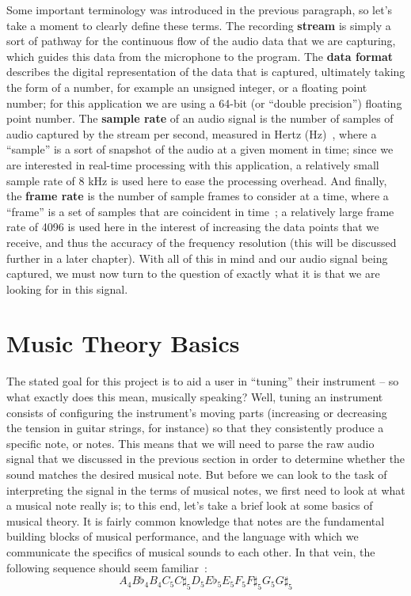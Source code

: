 \documentclass[12pt]{report}
\begin{document}
\indent Some important terminology was introduced in the previous paragraph, so let's take a moment to clearly define these terms. The recording {\bf stream} is simply a sort of pathway for the continuous flow of the audio data that we are capturing, which guides this data from the microphone to the program. The {\bf data format} describes the digital representation of the data that is captured, ultimately taking the form of a number, for example an unsigned integer, or a floating point number; for this application we are using a 64-bit (or ``double precision'') floating point number. The {\bf sample rate} of an audio signal is the number of samples of audio captured by the stream per second, measured in Hertz (Hz)~\cite{Audacity-nd}, where a ``sample'' is a sort of snapshot of the audio at a given moment in time; since we are interested in real-time processing with this application, a relatively small sample rate of 8 kHz is used here to ease the processing overhead. And finally, the {\bf frame rate} is the number of sample frames to consider at a time, where a ``frame'' is a set of samples that are coincident in time~\cite{Bernard2001}; a relatively large frame rate of 4096 is used here in the interest of increasing the data points that we receive, and thus the accuracy of the frequency resolution (this will be discussed further in a later chapter). With all of this in mind and our audio signal being captured, we must now turn to the question of exactly what it is that we are looking for in this signal.


\section{Music Theory Basics}
\indent The stated goal for this project is to aid a user in ``tuning'' their instrument -- so what exactly does this mean, musically speaking? Well, tuning an instrument consists of configuring the instrument's moving parts (increasing or decreasing the tension in guitar strings, for instance) so that they consistently produce a specific note, or notes. This means that we will need to parse the raw audio signal that we discussed in the previous section in order to determine whether the sound matches the desired musical note. But before we can look to the task of interpreting the signal in the terms of musical notes, we first need to look at what a musical note really is; to this end, let's take a brief look at some basics of musical theory. It is fairly common knowledge that notes are the fundamental building blocks of musical performance, and the language with which we communicate the specifics of musical sounds to each other. In that vein, the following sequence should seem familiar~\cite{SeventhString-nd}: 
$$ A_4 B\flat_4 B_4 C_5 C\sharp_5 D_5 E\flat_5 E_5 F_5 F\sharp_5 G_5 G\sharp_5 $$
\end{document}
